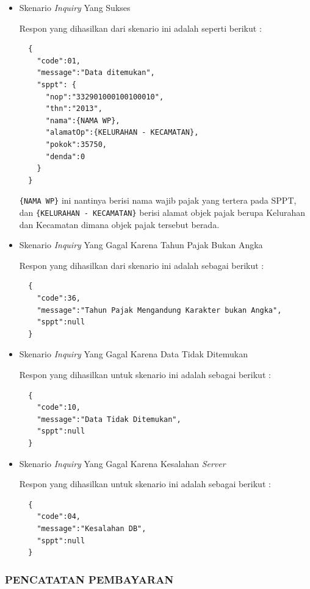 \documentclass[pdftex,12pt, oneside]{article}
\begin{document}
\begin{itemize}
  \item Skenario \textit{Inquiry} Yang Sukses
  
  Respon yang dihasilkan dari skenario ini adalah seperti berikut :
  
  \begin{lstlisting}
  {
    "code":01,
    "message":"Data ditemukan",
    "sppt": {
      "nop":"332901000100100010",
      "thn":"2013",
      "nama":{NAMA WP},
      "alamatOp":{KELURAHAN - KECAMATAN},
      "pokok":35750,
      "denda":0
    }
  }
  \end{lstlisting}
  
  \texttt{\{NAMA WP\}} ini nantinya berisi nama wajib pajak yang tertera pada SPPT, dan \texttt{\{KELURAHAN - KECAMATAN\}} berisi alamat objek pajak berupa Kelurahan dan Kecamatan dimana objek pajak tersebut berada.
  
  \item Skenario \textit{Inquiry} Yang Gagal Karena Tahun Pajak Bukan Angka
  
  Respon yang dihasilkan dari skenario ini adalah sebagai berikut :
  
  \begin{lstlisting}
  {
    "code":36,
    "message":"Tahun Pajak Mengandung Karakter bukan Angka",
    "sppt":null
  }
  \end{lstlisting}
  
  \item Skenario \textit{Inquiry} Yang Gagal Karena Data Tidak Ditemukan
  
  Respon yang dihasilkan untuk skenario ini adalah sebagai berikut :
  
  \begin{lstlisting}
  {
    "code":10,
    "message":"Data Tidak Ditemukan",
    "sppt":null
  }
  \end{lstlisting}
  
  \item Skenario \textit{Inquiry} Yang Gagal Karena Kesalahan \textit{Server}
  
  Respon yang dihasilkan untuk skenario ini adalah sebagai berikut :
  
  \begin{lstlisting}
  {
    "code":04,
    "message":"Kesalahan DB",
    "sppt":null
  }
  \end{lstlisting}
  
\end{itemize}

\subsubsection{PENCATATAN PEMBAYARAN}
\end{document}
